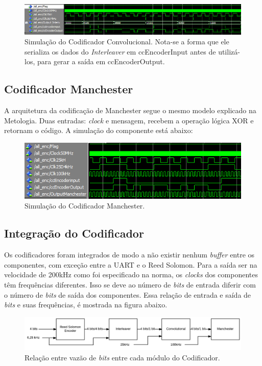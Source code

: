 	\begin{figure}[h]
		\caption{\label{figure:convolutional-simulation}Simulação do Codificador Convolucional. Nota-se a forma que ele serializa os dados do \textit{Interleaver} em ccEncoderInput antes de utilizá-los, para gerar a saída em ccEncoderOutput.}
		\centering
		\includegraphics[width=1\textwidth]{convolutional/simulation.png}
	\end{figure}

	\subsection{Codificador Manchester}

	A arquitetura da codificação de Manchester segue o mesmo modelo explicado na Metologia. Duas entradas: \textit{clock} e mensagem, recebem a operação lógica XOR e retornam o código. A simulação do componente está abaixo:

	\begin{figure}[h!]
		\caption{\label{figure:manchester-encoder-simulation}Simulação do Codificador Manchester.}
		\centering
		\includegraphics[width=0.5\textheight]{manchester/simulation-encoder.png}
	\end{figure}


	\subsection{Integração do Codificador}\label{section:execution-integration-encoder-speeds}

	Os codificadores foram integrados de modo a não existir nenhum \textit{buffer} entre os componentes, com exceção entre a UART e o Reed Solomon. Para a saída ser na velocidade de 200kHz como foi especificado na norma, os \textit{clocks} dos componentes têm frequências diferentes. Isso se deve ao número de \textit{bits} de entrada diferir com o número de \textit{bits} de saída dos componentes. Essa relação de entrada e saída de \textit{bits} e suas frequências, é mostrada na figura abaixo.
	\begin{figure}[h]
		\caption{\label{figure:integration-encoder}Relação entre vazão de \textit{bits} entre cada módulo do Codificador.}
		\centering
		\includegraphics[width=1\textwidth]{integration/speeds-encoder.pdf}
	\end{figure}

